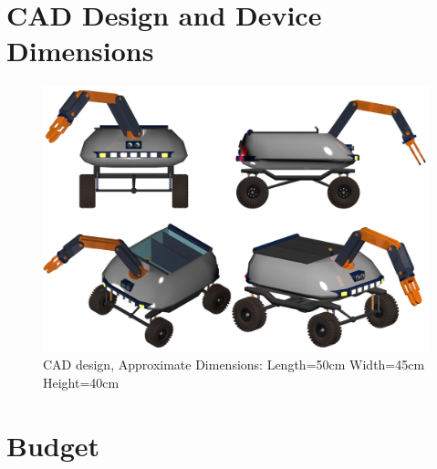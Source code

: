 \documentclass[12pt,a4paper]{article}
\begin{document}
 \section{CAD Design and Device Dimensions}
  \begin{flushleft}
   \begin{figure}[h!]
   \begin{center}
    \includegraphics[scale=0.2]{cad_design}
    \caption{CAD design, Approximate Dimensions: Length=50cm Width=45cm Height=40cm}
   \end{center}
  \end{figure}
  \end{flushleft}

 \section{Budget}
\end{document}
